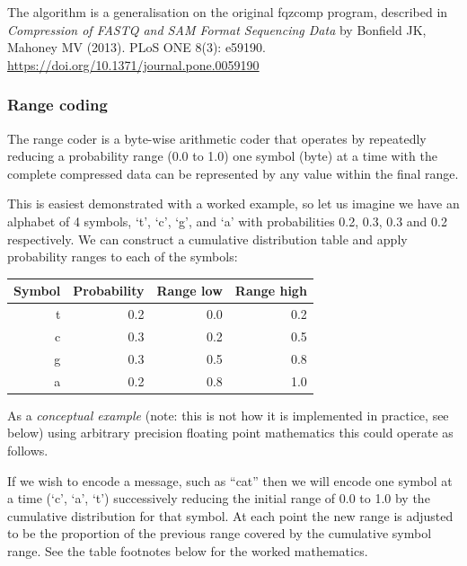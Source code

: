 \documentclass[a4paper]{article}
\begin{document}
The algorithm is a generalisation on the original fqzcomp program,
described in \textit{Compression of FASTQ and SAM Format Sequencing
  Data} by Bonfield JK, Mahoney MV (2013). PLoS ONE 8(3):
e59190. \url{https://doi.org/10.1371/journal.pone.0059190}

\subsubsection*{Range coding}

The range coder is a byte-wise arithmetic coder that operates by
repeatedly reducing a probability range (0.0 to 1.0) one symbol (byte)
at a time with the complete compressed data can be represented by any
value within the final range.

This is easiest demonstrated with a worked example, so let us imagine
we have an alphabet of 4 symbols, `t', `c', `g', and `a' with
probabilities 0.2, 0.3, 0.3 and 0.2 respectively.  We can construct a
cumulative distribution table and apply probability ranges to each of
the symbols:

\begin{tabular}{rrrr}
\hline
\textbf{Symbol} & \textbf{Probability} & \textbf{Range low} & \textbf{Range high}\\
\hline
t & 0.2 & 0.0 & 0.2 \\
c & 0.3 & 0.2 & 0.5 \\
g & 0.3 & 0.5 & 0.8 \\
a & 0.2 & 0.8 & 1.0 \\
\hline
\end{tabular}

As a \emph{conceptual example} (note: this is not how it is implemented in practice, see below) using arbitrary precision floating point mathematics this could operate as follows.

If we wish to encode a message, such as ``cat'' then we will encode
one symbol at a time (`c', `a', `t') successively reducing the
initial range of 0.0 to 1.0 by the cumulative distribution for that
symbol.  At each point the new range is adjusted to be the proportion
of the previous range covered by the cumulative symbol range.  See the
table footnotes below for the worked mathematics.
\end{document}
